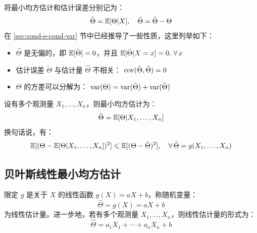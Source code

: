 \begin{property}
将最小均方估计和估计误差分别记为：
\[
\hat\Theta=\mathbb{E}[\Theta\vert X],\quad\tilde\Theta=\hat\Theta-\Theta
\]
在 \ref{sec:cond-e-cond-var} 节中已经推导了一些性质，这里列举如下：
\begin{itemize}
    \item $\hat\Theta$ 是无偏的，即 $\mathbb{E}[\tilde\Theta]=0$，并且 $\mathbb{E}[\tilde\Theta\vert X=x]=0,\,\forall\,x$
    \item 估计误差 $\tilde\Theta$ 与估计量 $\hat\Theta$ 不相关：
    $\mathrm{cov}(\hat\Theta,\tilde\Theta)=0$
    \item $\Theta$ 的方差可以分解为：
    $\mathrm{var}(\Theta)=\mathrm{var}(\hat\Theta)+\mathrm{var}(\tilde\Theta)$
\end{itemize}
\end{property}

\begin{theorem}[推广到多观测情形]
设有多个观测量 $X_1,\ldots,X_n$，则最小均方估计为：
\[
\hat\Theta=\mathbb{E}[\Theta\vert X_1,\ldots,X_n]
\]
换句话说，有：
\[
\mathbb{E}[(\Theta-\mathbb{E}[\Theta\vert X_1,\ldots,X_n])^2]\leqslant\mathbb{E}[(\Theta-\hat\Theta)^2],\quad\forall\,\hat\Theta=g(X_1,\ldots,X_n)
\]
\end{theorem}

\subsection{贝叶斯线性最小均方估计}
\label{sec:bayesian-lms}

\begin{definition}[线性估计量]
限定 $g$ 是关于 $X$ 的线性函数 $g(X)=aX+b$，称随机变量：
\[\hat\Theta=g(X)=aX+b\]
为线性估计量。进一步地，若有多个观测量 $X_1,\ldots,X_n$，则线性估计量的形式为：
\[\hat\Theta=a_1X_1+\cdots+a_nX_n+b\]
\end{definition}

